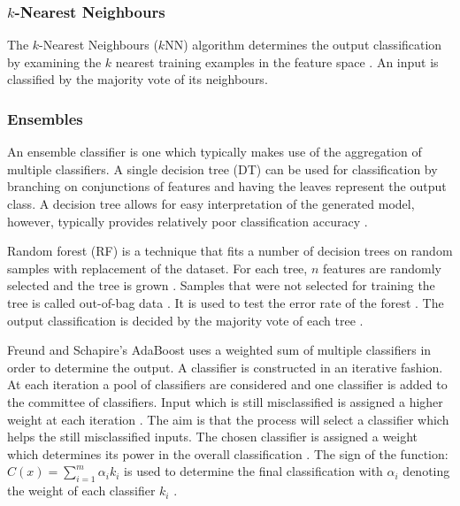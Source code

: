 \documentclass{sig-alternate-05-2015}
\begin{document}
	\subsubsection{$k$-Nearest Neighbours}
	The $k$-Nearest Neighbours ($k$NN) algorithm determines the output classification by examining the $k$ nearest training examples in the feature space \cite{6313426}. An input is classified by the majority vote of its neighbours.
	
	\subsubsection{Ensembles}
	An ensemble classifier is one which typically makes use of the aggregation of multiple classifiers. A single decision tree (DT) can be used for classification by branching on conjunctions of features and having the leaves represent the output class. A decision tree allows for easy interpretation of the generated model, however, typically provides relatively poor classification accuracy \cite{doi:10.1021/ci034160g}. 
	
	Random forest (RF) is a technique that fits a number of decision trees on random samples with replacement of the dataset. For each tree, $n$ features are randomly selected and the tree is grown \cite{WIDM:WIDM1072}. Samples that were not selected for training the tree is called out-of-bag data \cite{WIDM:WIDM1072}. It is used to test the error rate of the forest \cite{WIDM:WIDM1072, doi:10.1021/ci034160g}. The output classification is decided by the majority vote of each tree \cite{WIDM:WIDM1072}.
	
	Freund and Schapire's \cite{FREUND1997119} AdaBoost uses a weighted sum of multiple classifiers in order to determine the output. A classifier is constructed in an iterative fashion. At each iteration a pool of classifiers are considered and one classifier is added to the committee of classifiers. Input which is still misclassified is assigned a higher weight at each iteration \cite{Bergstra2006, rojas2009adaboost}. The aim is that the process will select a classifier which helps the still misclassified inputs. The chosen classifier is assigned a weight which determines its power in the overall classification \cite{Bergstra2006, rojas2009adaboost}. The sign of the function: $C(x) = \sum_{i=1}^{m} \alpha_i k_i$ is used to determine the final classification with $\alpha_i$ denoting the weight of each classifier $k_i$ \cite{Bergstra2006}. 
	
\end{document}
